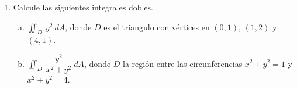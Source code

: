 \documentclass{article}
\begin{document}
\begin{enumerate}[{\bf P1)}, leftmargin=*, labelsep=3mm]
\begin{enumerate}[a)]
$$\begin{array}{rcl|}
          \hline
        \end{array}$$
        Resolviendo se obtienen los puntos críticos, $\left(\frac{3\sqrt{2}}{2},-\frac{3\sqrt{2}}{2}\right)$ y $\left(-\frac{3\sqrt{2}}{2},\frac{3\sqrt{2}}{2}\right)$, evaluando $f$ en estos puntos se obtiene
        \begin{eqnarray*}
          f\left(\frac{3\sqrt{2}}{2},-\frac{3\sqrt{2}}{2}\right) &=& \left(\frac{3\sqrt{2}}{2}\right)^2 + \left(-\frac{3\sqrt{2}}{2}\right)^2 + 4\cdot \frac{3\sqrt{2}}{2} - 4\cdot \left(-\frac{3\sqrt{2}}{2}\right)\\
          &=& \dfrac{9}{2} + \dfrac{9}{2} + 6\sqrt{2} + 6\sqrt{2}\\
          &=& 9 + 12\sqrt{2}
        \end{eqnarray*}
        \begin{eqnarray*}
          f\left(-\frac{3\sqrt{2}}{2},\frac{3\sqrt{2}}{2}\right) &=& \left(-\frac{3\sqrt{2}}{2}\right)^2 + \left(\frac{3\sqrt{2}}{2}\right)^2 + 4\cdot \left(-\frac{3\sqrt{2}}{2}\right) - 4\cdot \frac{3\sqrt{2}}{2}\\
          &=& \dfrac{9}{2} + \dfrac{9}{2} - 6\sqrt{2} - 6\sqrt{2}\\
          &=& 9 - 12\sqrt{2}
        \end{eqnarray*}
        Por lo tanto, el valor máximo absoluto es $9 + 12\sqrt{2}$ y el valor mínimo absoluto es $9 - 12\sqrt{2}$ y se alcanzan en los puntos $\left(\frac{3\sqrt{2}}{2},-\frac{3\sqrt{2}}{2}\right)$ y $\left(-\frac{3\sqrt{2}}{2},\frac{3\sqrt{2}}{2}\right)$ respectivamente.
    \end{enumerate}

  \newpage
  \item Calcule las siguientes integrales dobles.
    \begin{enumerate}[a)]
      \item $\displaystyle\iint_D\ y^2\ dA$, donde $D$ es el triangulo con vértices en $(0,1)$, $(1,2)$ y $(4,1)$. 
      \item $\displaystyle\iint_D\ \dfrac{y^2}{x^2+y^2}\ dA$, donde $D$ la región entre las circunferencias $x^2+y^2=1$ y $x^2+y^2=4$. 
    \end{enumerate}


\end{enumerate}
\end{document}

